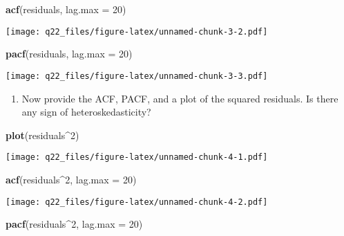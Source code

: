 \documentclass[
]{article}
\newenvironment{Shaded}{\begin{snugshade}}{\end{snugshade}}
\newcommand{\DataTypeTok}[1]{\textcolor[rgb]{0.13,0.29,0.53}{#1}}
\newcommand{\DecValTok}[1]{\textcolor[rgb]{0.00,0.00,0.81}{#1}}
\newcommand{\KeywordTok}[1]{\textcolor[rgb]{0.13,0.29,0.53}{\textbf{#1}}}
\newcommand{\NormalTok}[1]{#1}
\newcommand{\OperatorTok}[1]{\textcolor[rgb]{0.81,0.36,0.00}{\textbf{#1}}}
\providecommand{\tightlist}{%
  \setlength{\itemsep}{0pt}\setlength{\parskip}{0pt}}
\begin{document}
\begin{Shaded}
\begin{Highlighting}[]
\KeywordTok{acf}\NormalTok{(residuals, }\DataTypeTok{lag.max =} \DecValTok{20}\NormalTok{)}
\end{Highlighting}
\end{Shaded}

\texttt{[image: q22\_files/figure-latex/unnamed-chunk-3-2.pdf]}

\begin{Shaded}
\begin{Highlighting}[]
\KeywordTok{pacf}\NormalTok{(residuals, }\DataTypeTok{lag.max =} \DecValTok{20}\NormalTok{)}
\end{Highlighting}
\end{Shaded}

\texttt{[image: q22\_files/figure-latex/unnamed-chunk-3-3.pdf]}

\begin{enumerate}
\def\labelenumi{(\alph{enumi})}
\setcounter{enumi}{1}
\tightlist
\item
  Now provide the ACF, PACF, and a plot of the squared residuals. Is
  there any sign of heteroskedasticity?
\end{enumerate}

\begin{Shaded}
\begin{Highlighting}[]
\KeywordTok{plot}\NormalTok{(residuals}\OperatorTok{\^{}}\DecValTok{2}\NormalTok{)}
\end{Highlighting}
\end{Shaded}

\texttt{[image: q22\_files/figure-latex/unnamed-chunk-4-1.pdf]}

\begin{Shaded}
\begin{Highlighting}[]
\KeywordTok{acf}\NormalTok{(residuals}\OperatorTok{\^{}}\DecValTok{2}\NormalTok{, }\DataTypeTok{lag.max =} \DecValTok{20}\NormalTok{)}
\end{Highlighting}
\end{Shaded}

\texttt{[image: q22\_files/figure-latex/unnamed-chunk-4-2.pdf]}

\begin{Shaded}
\begin{Highlighting}[]
\KeywordTok{pacf}\NormalTok{(residuals}\OperatorTok{\^{}}\DecValTok{2}\NormalTok{, }\DataTypeTok{lag.max =} \DecValTok{20}\NormalTok{)}
\end{Highlighting}
\end{Shaded}
\end{document}
